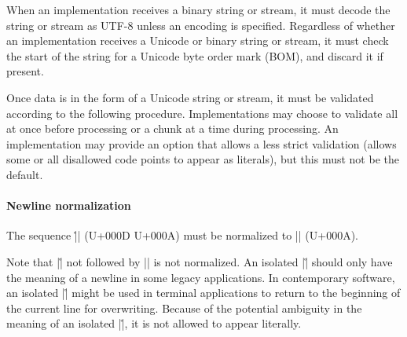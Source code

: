 \documentclass[11pt]{article}
\begin{document}
When an implementation receives a binary string or stream, it must decode the string or stream as UTF-8 unless an encoding is specified.  Regardless of whether an implementation receives a Unicode or binary string or stream, it must check the start of the string for a Unicode byte order mark (BOM), and discard it if present.

Once data is in the form of a Unicode string or stream, it must be validated according to the following procedure.  Implementations may choose to validate all at once before processing or a chunk at a time during processing.  An implementation may provide an option that allows a less strict validation (allows some or all disallowed code points to appear as literals), but this must not be the default.

\paragraph{Newline normalization}  The sequence |\r\n| (U+000D U+000A) must be normalized to |\n| (U+000A).

Note that |\r| not followed by |\n| is not normalized.  An isolated |\r| should only have the meaning of a newline in some legacy applications.  In contemporary software, an isolated |\r| might be used in terminal applications to return to the beginning of the current line for overwriting.  Because of the potential ambiguity in the meaning of an isolated |\r|, it is not allowed to appear literally.
\end{document}
